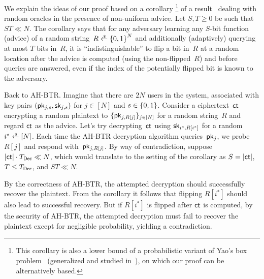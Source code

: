 We explain the ideas of our proof based on a corollary%
\footnote{This corollary is also a lower bound of a probabilistic variant of Yao's box problem~\cite{STOC:Yao90} (generalized and studied in~\cite{EC:CorHenKog22}), on which our proof can be alternatively based.
}
of a result~\cite{C:Unruh07} dealing with random oracles in the presence of non-uniform advice.
Let ${S,T\geq 0}$ be such that ${ST\ll N}$.
The corollary says that
for any adversary learning any $S$-bit function (advice) of a random string~${R\draws\bit^N}$ and additionally (adaptively) querying at most $T$ bits in~$R$,
it is ``indistinguishable'' to flip a bit in~$R$ at a random location
after the advice is computed (using the non-flipped~$R$) and
before queries are answered,
even if the index of the potentially flipped bit is known to the adversary.

Back to AH-BTR. Imagine that there are $2N$ users in the system, associated with key pairs $(\pk_{j,s},\sk_{j,s})$ for ${j\in[N]}$ and ${s\in{\{0,1\}}}$.
Consider a ciphertext~$\ct$ encrypting a random plaintext to $\{\pk_{j,R[j]}\}_{j\in[N]}$ for a random string~$R$ and
regard $\ct$ as the advice.
Let's try decrypting~$\ct$ using $\sk_{i^\ast,R[i^\ast]}$ for a random ${i^\ast\draws[N]}$.
Each time the AH-BTR decryption algorithm queries~$\pk_j$,
we probe $R[j]$ and respond with~$\pk_{j,R[j]}$.
By way of contradiction, suppose ${|\ct|\cdot\TDec\ll N}$,
which would translate to the setting of the corollary as ${S=|\ct|}$, ${T\leq\TDec}$, and ${ST\ll N}$.

By the correctness of AH-BTR,
the attempted decryption should successfully recover the plaintext.
From the corollary it follows that flipping $R[i^\ast]$ should also lead to successful recovery.
But if $R[i^\ast]$ is flipped after $\ct$ is computed,
by the security of AH-BTR,
the attempted decryption must fail to recover the plaintext except for negligible probability, yielding a contradiction.
